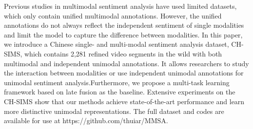 Previous studies in multimodal sentiment analysis have used limited datasets, which only contain unified multimodal annotations. However, the unified annotations do not always reflect the independent sentiment of single modalities and limit the model to capture the difference between modalities. In this paper, we introduce a Chinese single- and multi-modal sentiment analysis dataset, CH-SIMS, which contains 2,281 refined video segments in the wild with both multimodal and independent unimodal annotations. It allows researchers to study the interaction between modalities or use independent unimodal annotations for unimodal sentiment analysis.Furthermore, we propose a multi-task learning framework based on late fusion as the baseline. Extensive experiments on the CH-SIMS show that our methods achieve state-of-the-art performance and learn more distinctive unimodal representations. The full dataset and codes are available for use at https://github.com/thuiar/MMSA.

